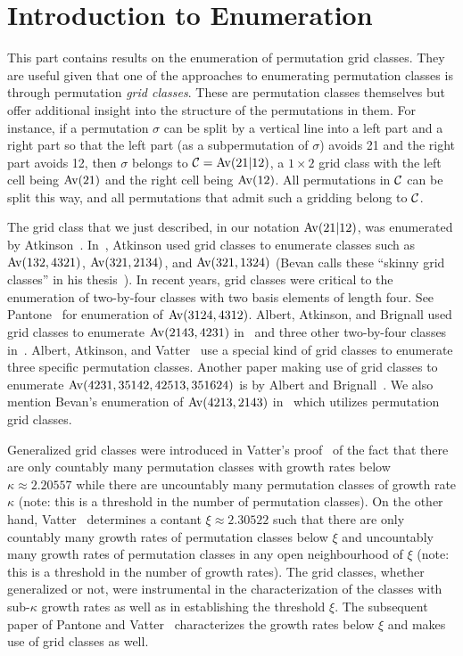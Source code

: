 \documentclass[12pt, a4paper, twoside]{report}
\begin{document}
\chapter{Introduction to Enumeration}
\label{chap:enumintro}
This part contains results on the enumeration of permutation grid classes. They are useful given that one of the approaches to enumerating permutation classes is through permutation \emph{grid classes}. These are permutation classes themselves but offer additional insight into the structure of the permutations in them. For instance, if a permutation $\sigma$ can be split by a vertical line into a left part and a right part so that the left part (as a subpermutation of $\sigma$) avoids 21 and the right part avoids 12, then $\sigma$ belongs to $\mathcal{C} = \mathrm{Av}(21|12)$, a $1\times 2$ grid class with the left cell being $\mathrm{Av}(21)$ and the right cell being $\mathrm{Av}(12)$. All permutations in $\mathcal{C}$ can be split this way, and all permutations that admit such a gridding belong to $\mathcal{C}$.

The grid class that we just described, in our notation $\mathrm{Av}(21|12)$, was enumerated by Atkinson~\cite{atkinson1998incrdecr}. In~\cite{atkinson1997restricted}, Atkinson used grid classes to enumerate classes such as $\mathrm{Av}(132,4321)$, $\mathrm{Av}(321,2134)$, and $\mathrm{Av}(321,1324)$ (Bevan calls these ``skinny grid classes'' in his thesis~\cite{bevan2015thesis}). In recent years, grid classes were critical to the enumeration of two-by-four classes with two basis elements of length four. See Pantone~\cite{pantone2by4} for enumeration of $\mathrm{Av}(3124,4312)$. Albert, Atkinson, and Brignall used grid classes to enumerate $\mathrm{Av}(2143,4231)$ in~\cite{albert2011enumeration} and three other two-by-four classes in~\cite{albert2012gridclasses}. Albert, Atkinson, and Vatter~\cite{albert2012inflations} use a special kind of grid classes to enumerate three specific permutation classes. Another paper making use of grid classes to enumerate $\mathrm{Av}(4231, 35142, 42513, 351624)$ is by Albert and Brignall~\cite{albert2014schubert}. We also mention Bevan's enumeration of $\mathrm{Av}(4213,2143)$ in~\cite{bevan-new} which utilizes permutation grid classes. 

Generalized grid classes were introduced in Vatter's proof~\cite{vatter11small} of the fact that there are only countably many permutation classes with growth rates below $\kappa \approx 2.20557$ while there are uncountably many permutation classes of growth rate $\kappa$ (note: this is a threshold in the number of permutation classes). On the other hand,  Vatter~\cite{vattercountableuncountable} determines a contant $\xi\approx 2.30522$ such that there are only countably many growth rates of permutation classes below $\xi$ and uncountably many growth rates of permutation classes in any open neighbourhood of $\xi$ (note: this is a threshold in the number of growth rates). The grid classes, whether generalized or not, were instrumental in the characterization of the classes with sub-$\kappa$ growth rates as well as in establishing the threshold $\xi$. The subsequent paper of Pantone and Vatter~\cite{pantonevatter16categorize} characterizes the growth rates below $\xi$ and makes use of grid classes as well.
\end{document}
